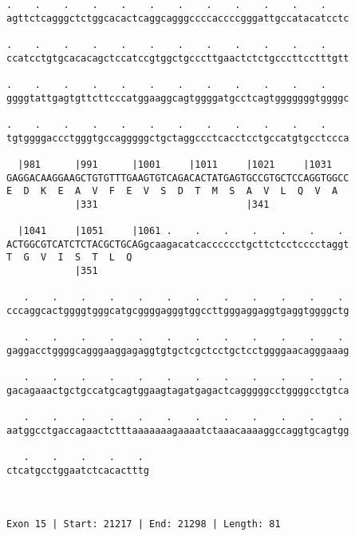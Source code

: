 \documentclass{article}
\begin{document}
\begin{Verbatim}
.    .    .    .    .    .    .    .    .    .    .    .    
agttctcagggctctggcacactcaggcagggccccaccccgggattgccatacatcctc
                                                            
.    .    .    .    .    .    .    .    .    .    .    .    
ccatcctgtgcacacagctccatccgtggctgcccttgaactctctgcccttcctttgtt
                                                            
.    .    .    .    .    .    .    .    .    .    .    .    
ggggtattgagtgttcttcccatggaaggcagtggggatgcctcagtgggggggtggggc
                                                            
.    .    .    .    .    .    .    .    .    .    .    .    
tgtggggaccctgggtgccagggggctgctaggccctcacctcctgccatgtgcctccca
                                                            
  |981      |991      |1001     |1011     |1021     |1031   
GAGGACAAGGAAGCTGTGTTTGAAGTGTCAGACACTATGAGTGCCGTGCTCCAGGTGGCC
E  D  K  E  A  V  F  E  V  S  D  T  M  S  A  V  L  Q  V  A  
            |331                          |341              
  
  |1041     |1051     |1061 .    .    .    .    .    .    . 
ACTGGCGTCATCTCTACGCTGCAGgcaagacatcacccccctgcttctcctcccctaggt
T  G  V  I  S  T  L  Q                                      
            |351                                            
  
   .    .    .    .    .    .    .    .    .    .    .    . 
cccaggcactggggtgggcatgcggggagggtggccttgggaggaggtgaggtggggctg
                                                            
   .    .    .    .    .    .    .    .    .    .    .    . 
gaggacctggggcagggaaggagaggtgtgctcgctcctgctcctggggaacagggaaag
                                                            
   .    .    .    .    .    .    .    .    .    .    .    . 
gacagaaactgctgccatgcagtggaagtagatgagactcagggggcctggggcctgtca
                                                            
   .    .    .    .    .    .    .    .    .    .    .    . 
aatggcctgaccagaactctttaaaaaaagaaaatctaaacaaaaggccaggtgcagtgg
                                                            
   .    .    .    .    . 
ctcatgcctggaatctcacactttg
                         
                         
 
Exon 15 | Start: 21217 | End: 21298 | Length: 81




\end{Verbatim}
\end{document}
